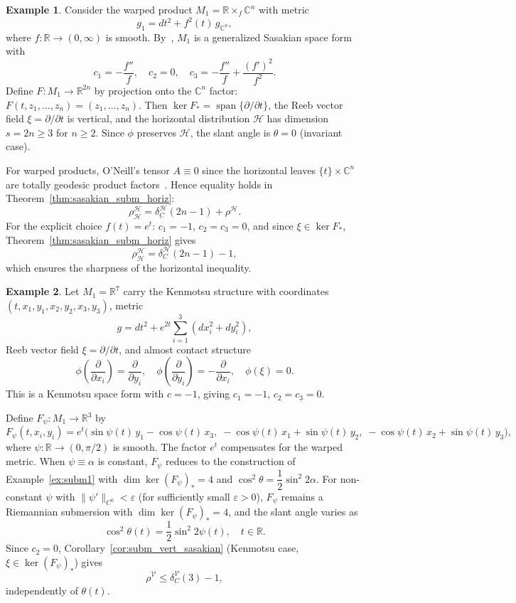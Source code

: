 \documentclass[11pt]{amsart}
\theoremstyle{plain}
\theoremstyle{definition}
\newtheorem{example}{Example}[section]
\theoremstyle{remark}
\DeclareMathOperator{\Span}{span}
\newcommand{\R}{\mathbb{R}}
\newcommand{\C}{\mathbb{C}}
\newcommand{\calH}{\mathcal{H}}
\newcommand{\calV}{\mathcal{V}}
\begin{document}
\begin{example}\label{ex:subm2}
Consider the warped product 
$M_1 = \R \times_f \C^n$ with metric
\[
g_1 = dt^2 + f^2(t)\,g_{\C^n},
\]
where $f : \R \to (0,\infty)$ is smooth. 
By~\cite{Alegre2004}, $M_1$ is a generalized 
Sasakian space form with
\[
c_1 = -\dfrac{f''}{f}, \quad c_2 = 0, \quad 
c_3 = -\dfrac{f''}{f} + \dfrac{(f')^2}{f^2}.
\]
Define $F : M_1 \to \R^{2n}$ by projection onto 
the $\C^n$ factor:
$F(t, z_1, \ldots, z_n) = (z_1, \ldots, z_n)$.
Then $\ker F_* = \Span\{\partial/\partial t\}$, 
the Reeb vector field $\xi = \partial/\partial t$ 
is vertical, and the horizontal distribution 
$\calH$ has dimension $s = 2n \geq 3$ for 
$n \geq 2$. Since $\phi$ preserves $\calH$, 
the slant angle is $\theta = 0$ (invariant case).

For warped products, O'Neill's tensor 
$A \equiv 0$ since the horizontal leaves 
$\{t\} \times \C^n$ are totally geodesic product 
factors~\cite{Falcitelli2004}. Hence equality 
holds in Theorem~\ref{thm:sasakian_subm_horiz}:
\[
\rho_{\calH}^{\calH} 
= \delta_C^{\calH}(2n-1) + \rho^{\calH}.
\]
For the explicit choice $f(t) = e^t$: 
$c_1 = -1$, $c_2 = c_3 = 0$, and since 
$\xi \in \ker F_*$, 
Theorem~\ref{thm:sasakian_subm_horiz} gives
\[
\rho_{\calH}^{\calH} 
= \delta_C^{\calH}(2n-1) - 1,
\]
which ensures the sharpness of the horizontal inequality.
\end{example}

\begin{example}\label{ex:subm3}
Let $M_1 = \R^7$ carry the Kenmotsu structure 
with coordinates 
$(t, x_1, y_1, x_2, y_2, x_3, y_3)$, metric
\[
g = dt^2 + e^{2t}\sum_{i=1}^3(dx_i^2 + dy_i^2),
\]
Reeb vector field $\xi = \partial/\partial t$, and 
almost contact structure
\[
\phi\!\left(\dfrac{\partial}{\partial x_i}\right) 
= \dfrac{\partial}{\partial y_i}, \quad
\phi\!\left(\dfrac{\partial}{\partial y_i}\right) 
= -\dfrac{\partial}{\partial x_i}, \quad
\phi(\xi) = 0.
\]
This is a Kenmotsu space form with $c = -1$, 
giving $c_1 = -1$, $c_2 = c_3 = 0$.

Define $F_\psi : M_1 \to \R^3$ by
\[
F_\psi(t, x_i, y_i) 
= e^t\bigl(
  \sin\psi(t)\, y_1 - \cos\psi(t)\, x_3,\;
  -\cos\psi(t)\, x_1 + \sin\psi(t)\, y_2,\;
  -\cos\psi(t)\, x_2 + \sin\psi(t)\, y_3\bigr),
\]
where $\psi : \R \to (0,\pi/2)$ is smooth. 
The factor $e^t$ compensates for the warped metric. 
When $\psi \equiv \alpha$ is constant, $F_\psi$ 
reduces to the construction of 
Example~\ref{ex:subm1} with $\dim\ker(F_\psi)_* = 4$ 
and $\cos^2\theta = \dfrac{1}{2}\sin^2 2\alpha$.
For non-constant $\psi$ with 
$\|\psi'\|_{C^0} < \varepsilon$ (for sufficiently 
small $\varepsilon > 0$), $F_\psi$ remains a 
Riemannian submersion with $\dim\ker(F_\psi)_* = 4$, 
and the slant angle varies as
\[
\cos^2\theta(t) = \dfrac{1}{2}\sin^2 2\psi(t),
\quad t \in \R.
\]
Since $c_2 = 0$, 
Corollary~\ref{cor:subm_vert_sasakian} (Kenmotsu 
case, $\xi \in \ker(F_\psi)_*$) gives
\[
\rho^{\calV} \leq \delta_C^{\calV}(3) - 1,
\]
independently of $\theta(t)$.
\end{example}
\end{document}
